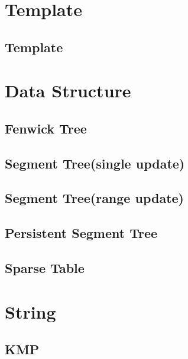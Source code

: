 \section{Template}
\subsection{Template}
\raggedbottom
\hrulefill
\section{Data Structure}
\subsection{Fenwick Tree}
\raggedbottom
\subsection{Segment Tree(single update)}
\raggedbottom
\subsection{Segment Tree(range update)}
\raggedbottom
\subsection{Persistent Segment Tree}
\raggedbottom
\subsection{Sparse Table}
\raggedbottom
\hrulefill
\section{String}
\subsection{KMP}
\raggedbottom
